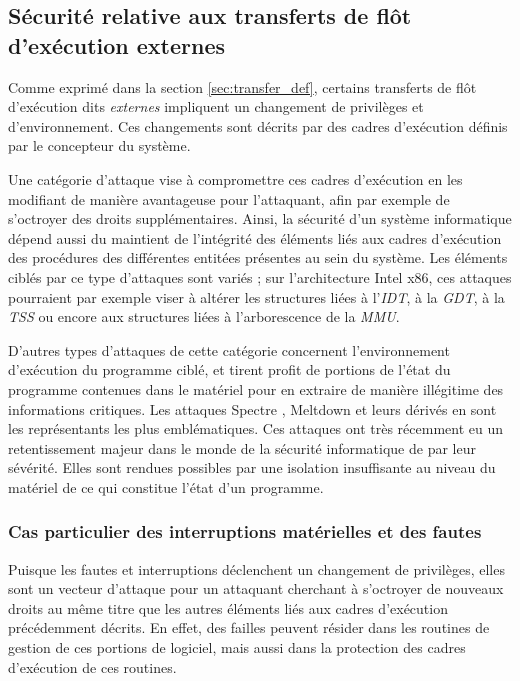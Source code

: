 		\subsection{Sécurité relative aux transferts de flôt d'exécution externes}

			Comme exprimé dans la section \ref{sec:transfer_def}, certains transferts de flôt d'exécution dits \emph{externes} impliquent un changement de privilèges et d'environnement. Ces changements sont décrits par des cadres d'exécution définis par le concepteur du système.

			Une catégorie d'attaque vise à compromettre ces cadres d'exécution en les modifiant de manière avantageuse pour l'attaquant, afin par exemple de s'octroyer des droits supplémentaires. Ainsi, la sécurité d'un système informatique dépend aussi du maintient de l'intégrité des éléments liés aux cadres d'exécution des procédures des différentes entitées présentes au sein du système. Les éléments ciblés par ce type d'attaques sont variés ; sur l'architecture Intel x86, ces attaques pourraient par exemple viser à altérer les structures liées à l'\emph{IDT}, à la \emph{GDT}, à la \emph{TSS} ou encore aux structures liées à l'arborescence de la \emph{MMU}.

			D'autres types d'attaques de cette catégorie concernent l'environnement d'exécution du programme ciblé, et tirent profit de portions de l'état du programme contenues dans le matériel pour en extraire de manière illégitime des informations critiques. Les attaques Spectre \cite{kocher2020spectre}, Meltdown \cite{lipp2020meltdown} et leurs dérivés en sont les représentants les plus emblématiques. Ces attaques ont très récemment eu un retentissement majeur dans le monde de la sécurité informatique de par leur sévérité. Elles sont rendues possibles par une isolation insuffisante au niveau du matériel de ce qui constitue l'état d'un programme.

		\subsubsection{Cas particulier des interruptions matérielles et des fautes}

Puisque les fautes et interruptions déclenchent un changement de privilèges, elles sont un vecteur d'attaque pour un attaquant cherchant à s'octroyer de nouveaux droits au même titre que les autres éléments liés aux cadres d'exécution précédemment décrits. En effet, des failles peuvent résider dans les routines de gestion de ces portions de logiciel, mais aussi dans la protection des cadres d'exécution de ces routines. 

